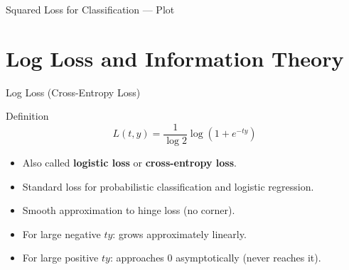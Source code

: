 \begin{frame}{Squared Loss for Classification — Plot}
  \begin{center}
  \end{center}
\end{frame}

\section{Log Loss and Information Theory}

\begin{frame}{Log Loss (Cross-Entropy Loss)}
  \begin{block}{Definition}
    \[
      L(t,y) = \frac{1}{\log 2}\log\!\left(1+e^{-ty}\right)
    \]
  \end{block}
  \begin{itemize}
    \item Also called \textbf{logistic loss} or \textbf{cross-entropy loss}.
    \item Standard loss for probabilistic classification and logistic regression.
    \item Smooth approximation to hinge loss (no corner).
    \item For large negative $ty$: grows approximately linearly.
    \item For large positive $ty$: approaches 0 asymptotically (never reaches it).
  \end{itemize}
\end{frame}


